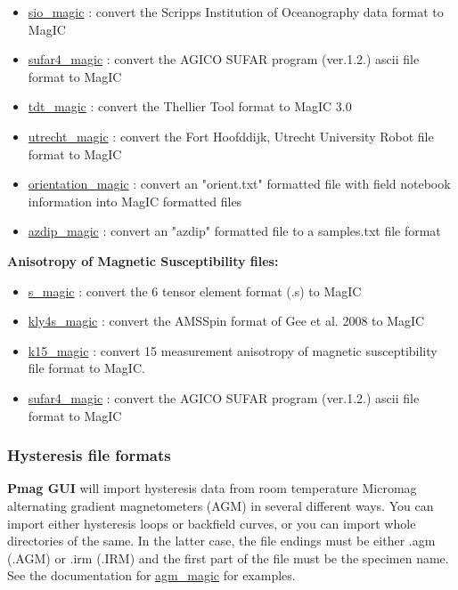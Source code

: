 \documentclass[11pt]{book}
\begin{document}
{{\begin{itemize}
\item \href{http://pmagpy.github.io/PmagPy_MagIC.html#sio_magic}{sio\_magic} : convert the Scripps Institution of Oceanography data format to MagIC
\item \href{http://pmagpy.github.io/PmagPy_MagIC.html#sufar4_magic}{sufar4\_magic} : convert the AGICO SUFAR program (ver.1.2.) ascii file format to MagIC
\item \href{http://pmagpy.github.io/PmagPy_MagIC.html#tdt_magic}{tdt\_magic} : convert the Thellier Tool format to MagIC 3.0
\item \href{http://pmagpy.github.io/PmagPy_MagIC.html#utrecht_magic}{utrecht\_magic} : convert the Fort Hoofddijk, Utrecht University Robot file format to MagIC
\item \href{http://pmagpy.github.io/PmagPy_MagIC.html#orientation_magic}{orientation\_magic} : convert an "orient.txt" formatted file with field notebook information into MagIC formatted files
\item \href{http://pmagpy.github.io/PmagPy_MagIC.html#azdip_magic}{azdip\_magic} : convert an "azdip" formatted file to a samples.txt file format
\end{itemize}



{\bf Anisotropy of Magnetic Susceptibility files:}

\begin{itemize}
\item \href{http://pmagpy.github.io/PmagPy_MagIC.html#s_magic}{s\_magic} : convert the 6 tensor element format (.s) to MagIC
\item \href{http://pmagpy.github.io/PmagPy_MagIC.html#kly4s_magic}{kly4s\_magic} : convert the AMSSpin format of Gee et al. 2008 to MagIC
\item \href{http://pmagpy.github.io/PmagPy_MagIC.html#k15_magic}{k15\_magic} : convert  15 measurement anisotropy of magnetic susceptibility file format to MagIC. \nocite{tauxe98}
\item \href{http://pmagpy.github.io/PmagPy_MagIC.html#sufar4_magic}{sufar4\_magic} : convert the AGICO SUFAR program (ver.1.2.) ascii file format to MagIC

\end{itemize}


\subsubsection{Hysteresis file formats}
{\bf Pmag GUI} will import hysteresis data from room temperature  Micromag alternating gradient magnetometers (AGM)  in several different ways.  You can import either hysteresis loops or backfield curves, or you can import whole directories of the same.  In the latter case, the file endings must be either .agm (.AGM) or .irm (.IRM) and the first part of the file must be the specimen name.
 See the documentation for  \href{http://pmagpy.github.io/PmagPy_MagIC.html#agm_magic}{agm\_magic} for examples.


}}
\end{document}
